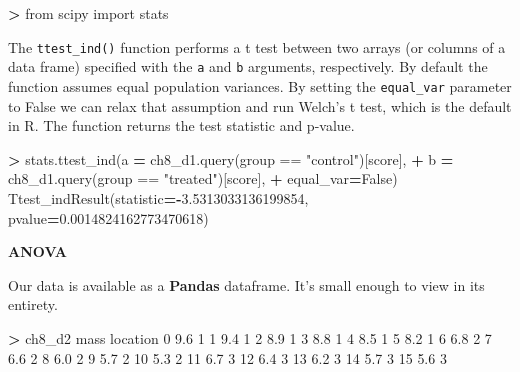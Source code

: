 \documentclass[
]{book}
\newenvironment{Shaded}{\begin{snugshade}}{\end{snugshade}}
\newcommand{\DecValTok}[1]{\textcolor[rgb]{0.00,0.00,0.81}{#1}}
\newcommand{\FloatTok}[1]{\textcolor[rgb]{0.00,0.00,0.81}{#1}}
\newcommand{\ImportTok}[1]{#1}
\newcommand{\NormalTok}[1]{#1}
\newcommand{\OperatorTok}[1]{\textcolor[rgb]{0.81,0.36,0.00}{\textbf{#1}}}
\newcommand{\StringTok}[1]{\textcolor[rgb]{0.31,0.60,0.02}{#1}}
\newcommand{\VariableTok}[1]{\textcolor[rgb]{0.00,0.00,0.00}{#1}}
\begin{document}
\begin{Shaded}
\begin{Highlighting}[]
\OperatorTok{\textgreater{}} \ImportTok{from}\NormalTok{ scipy }\ImportTok{import}\NormalTok{ stats}
\end{Highlighting}
\end{Shaded}

The \texttt{ttest\_ind()} function performs a t test between two arrays (or columns of a data frame) specified with the \texttt{a} and \texttt{b} arguments, respectively. By default the function assumes equal population variances. By setting the \texttt{equal\_var} parameter to False we can relax that assumption and run Welch's t test, which is the default in R. The function returns the test statistic and p-value.

\begin{Shaded}
\begin{Highlighting}[]
\OperatorTok{\textgreater{}}\NormalTok{ stats.ttest\_ind(a }\OperatorTok{=}\NormalTok{ ch8\_d1.query(}\StringTok{\textquotesingle{}group == "control"\textquotesingle{}}\NormalTok{)[}\StringTok{\textquotesingle{}score\textquotesingle{}}\NormalTok{], }
\OperatorTok{+}\NormalTok{                 b }\OperatorTok{=}\NormalTok{ ch8\_d1.query(}\StringTok{\textquotesingle{}group == "treated"\textquotesingle{}}\NormalTok{)[}\StringTok{\textquotesingle{}score\textquotesingle{}}\NormalTok{],}
\OperatorTok{+}\NormalTok{                 equal\_var}\OperatorTok{=}\VariableTok{False}\NormalTok{)}
\NormalTok{Ttest\_indResult(statistic}\OperatorTok{={-}}\FloatTok{3.5313033136199854}\NormalTok{, pvalue}\OperatorTok{=}\FloatTok{0.0014824162773470618}\NormalTok{)}
\end{Highlighting}
\end{Shaded}

\textbf{ANOVA}

Our data is available as a \textbf{Pandas} dataframe. It's small enough to view in its entirety.

\begin{Shaded}
\begin{Highlighting}[]
\OperatorTok{\textgreater{}}\NormalTok{ ch8\_d2}
\NormalTok{    mass location}
\DecValTok{0}    \FloatTok{9.6}        \DecValTok{1}
\DecValTok{1}    \FloatTok{9.4}        \DecValTok{1}
\DecValTok{2}    \FloatTok{8.9}        \DecValTok{1}
\DecValTok{3}    \FloatTok{8.8}        \DecValTok{1}
\DecValTok{4}    \FloatTok{8.5}        \DecValTok{1}
\DecValTok{5}    \FloatTok{8.2}        \DecValTok{1}
\DecValTok{6}    \FloatTok{6.8}        \DecValTok{2}
\DecValTok{7}    \FloatTok{6.6}        \DecValTok{2}
\DecValTok{8}    \FloatTok{6.0}        \DecValTok{2}
\DecValTok{9}    \FloatTok{5.7}        \DecValTok{2}
\DecValTok{10}   \FloatTok{5.3}        \DecValTok{2}
\DecValTok{11}   \FloatTok{6.7}        \DecValTok{3}
\DecValTok{12}   \FloatTok{6.4}        \DecValTok{3}
\DecValTok{13}   \FloatTok{6.2}        \DecValTok{3}
\DecValTok{14}   \FloatTok{5.7}        \DecValTok{3}
\DecValTok{15}   \FloatTok{5.6}        \DecValTok{3}
\end{Highlighting}
\end{Shaded}
\end{document}
